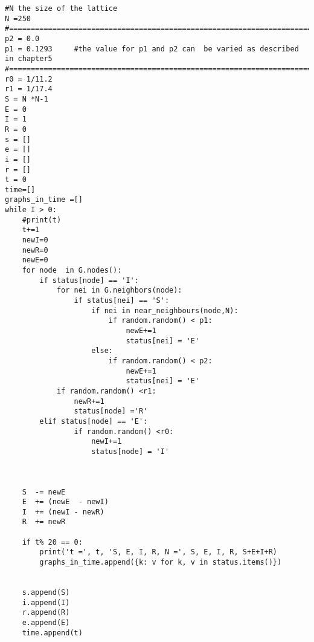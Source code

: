 \begin{verbatim}
#N the size of the lattice 
N =250
#===============================================================================
p2 = 0.0
p1 = 0.1293     #the value for p1 and p2 can  be varied as described in chapter5
#================================================================================
r0 = 1/11.2
r1 = 1/17.4
S = N *N-1
E = 0
I = 1
R = 0
s = []
e = []
i = []
r = []
t = 0
time=[]
graphs_in_time =[]
while I > 0:
    #print(t)
    t+=1
    newI=0
    newR=0
    newE=0
    for node  in G.nodes():
        if status[node] == 'I':
            for nei in G.neighbors(node):
                if status[nei] == 'S':
                    if nei in near_neighbours(node,N):
                        if random.random() < p1:
                            newE+=1
                            status[nei] = 'E'
                    else:
                        if random.random() < p2:
                            newE+=1
                            status[nei] = 'E' 
            if random.random() <r1:
                newR+=1
                status[node] ='R'
        elif status[node] == 'E': 
                if random.random() <r0:
                    newI+=1
                    status[node] = 'I'
            

        
    S  -= newE 
    E  += (newE  - newI)
    I  += (newI - newR)
    R  += newR
 
    if t% 20 == 0:
        print('t =', t, 'S, E, I, R, N =', S, E, I, R, S+E+I+R)
        graphs_in_time.append({k: v for k, v in status.items()})
 

    s.append(S)
    i.append(I)
    r.append(R)
    e.append(E)
    time.append(t)
\end{verbatim}
